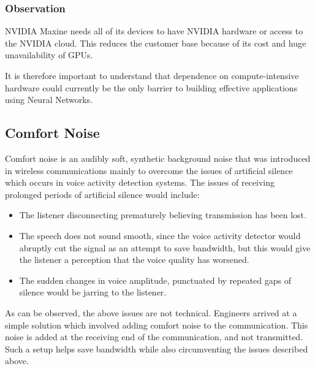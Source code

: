 \subsubsection{Observation}

NVIDIA Maxine needs all of its devices to have NVIDIA hardware or access to the NVIDIA cloud. 
This reduces the customer base because of its cost and huge unavailability of GPUs.

It is therefore important to understand that dependence on compute-intensive hardware could
currently be the only barrier to building effective applications using Neural Networks.

\subsection{Comfort Noise}

Comfort noise is an audibly soft, synthetic background noise that was introduced in wireless communications 
mainly to overcome the issues of artificial silence which occurs in voice activity detection systems.
The issues of receiving prolonged periods of artificial silence would include:

\begin{itemize}
    \item The listener disconnecting prematurely believing transmission has been lost.
    \item The speech does not sound smooth, since the voice activity detector would 
    abruptly cut the signal as an attempt to save bandwidth, but this would give the 
    listener a perception that the voice quality has worsened.
    \item The sudden changes in voice amplitude, punctuated by repeated gaps of silence 
    would be jarring to the listener.
\end{itemize}

As can be observed, the above issues are not technical. Engineers arrived at a simple solution which involved adding 
comfort noise to the communication. This noise is added at the receiving end of the communication, and not transmitted.~\cite{ComfortNoise}
Such a setup helps save bandwidth while also circumventing the issues described above.